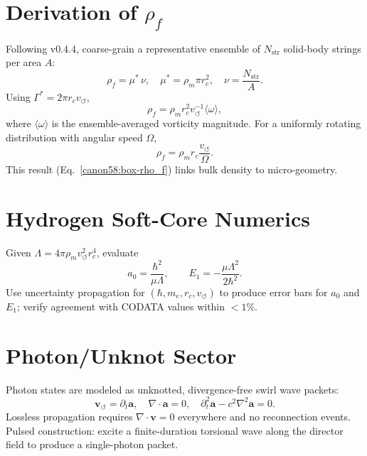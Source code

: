 \documentclass[reprint,aps,onecolumn,nofootinbib]{revtex4-2}
\begin{document}
    \section{Derivation of $\rho_{\!f}$}
    \label{canon58:appC}
    Following v0.4.4, coarse-grain a representative ensemble of $N_{\mathrm{str}}$
    solid-body strings per area $A$:
    \[
        \rho_{\!f} = \mu^{*}\,\nu, \quad
        \mu^{*} = \rho_{\!m} \pi r_c^{2}, \quad
        \nu = \frac{N_{\mathrm{str}}}{A}.
    \]
    Using $\Gamma^{*} = 2\pi r_c v_{\!\boldsymbol{\circlearrowleft}}$,
    \[
        \rho_{\!f} = \rho_{\!m} r_c^{2} v_{\!\boldsymbol{\circlearrowleft}}^{-1} \langle \omega \rangle,
    \]
    where $\langle \omega \rangle$ is the ensemble-averaged vorticity magnitude.
    For a uniformly rotating distribution with angular speed $\Omega$,
    \[
        \rho_{\!f} = \rho_{\!m} r_c \frac{v_{\!\boldsymbol{\circlearrowleft}}}{\Omega}.
    \]
    This result (Eq.~\eqref{canon58:box-rho_f}) links bulk density to micro-geometry.

    \section{Hydrogen Soft-Core Numerics}
    \label{canon58:appD}
    Given $\Lambda = 4\pi \rho_{\!m} v_{\!\boldsymbol{\circlearrowleft}}^{2} r_c^{4}$,
    evaluate
    \[
        a_0 = \frac{\hbar^{2}}{\mu \Lambda}, \qquad
        E_1 = - \frac{\mu \Lambda^{2}}{2\hbar^{2}}.
    \]
    Use uncertainty propagation for $(\hbar, m_e, r_c, v_{\!\boldsymbol{\circlearrowleft}})$ to
    produce error bars for $a_0$ and $E_1$; verify agreement with CODATA values
    within $<1\%$.

    \section{Photon/Unknot Sector}
    \label{canon58:appE}
    Photon states are modeled as unknotted, divergence-free swirl wave packets:
    \[
        \mathbf{v}_{\!\boldsymbol{\circlearrowleft}} = \partial_t \mathbf{a}, \quad
        \nabla \cdot \mathbf{a} = 0, \quad
        \partial_t^{2}\mathbf{a} - c^{2}\nabla^{2}\mathbf{a} = 0.
    \]
    Lossless propagation requires $\nabla\cdot\mathbf{v}=0$ everywhere and
    no reconnection events. Pulsed construction: excite a finite-duration
    torsional wave along the director field to produce a single-photon packet.
\end{document}
